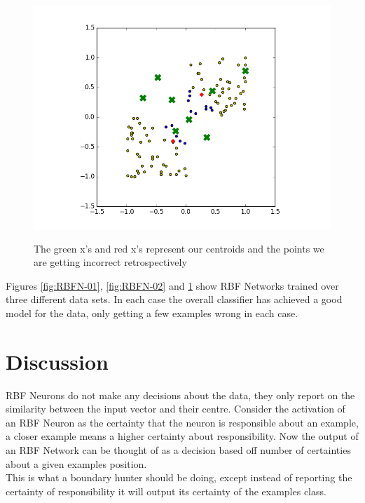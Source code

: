 \documentclass[notitlepage]{report}
\theoremstyle{definition}
\begin{document}
\begin{figure}[H]
  \centering
  \begin{minipage}[b]{0.7\textwidth}
    \includegraphics[width=\textwidth]{RBFN-03.png}
    \caption{}
    \label{fig:RBFN-03}
  \end{minipage}
  \hfill

The green x's and red x's represent our centroids and the points we are getting incorrect retrospectively
\end{figure}

Figures \ref{fig:RBFN-01}, \ref{fig:RBFN-02} and \ref{fig:RBFN-03} show RBF Networks trained over three different data sets. In each case the overall classifier has achieved a good model for the data, only getting a few examples wrong in each case.\\

\section{Discussion}
RBF Neurons do not make any decisions about the data, they only report on the similarity between the input vector and their centre. Consider the activation of an RBF Neuron as the certainty that the neuron is responsible about an example, a closer example means a higher certainty about responsibility. Now the output of an RBF Network can be thought of as a decision based off number of certainties about a given examples position.\\

This is what a boundary hunter should be doing, except instead of reporting the certainty of responsibility it will output its certainty of the examples class.
\end{document}
